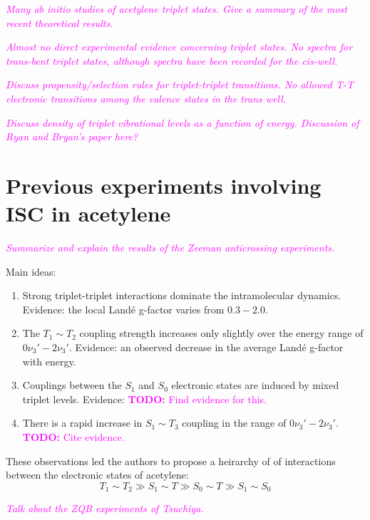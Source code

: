 \documentclass[12pt]{mitthesis}
\newcommand{\TODO} [1]{\textcolor{magenta}{\textbf{TODO:} #1}}
\newcommand{\POINT}[1]{\textcolor{magenta}{\emph{#1}}}
\begin{document}
\POINT{Many ab initio studies of acetylene triplet states.  Give a
  summary of the most recent theoretical results.}

\POINT{Almost no direct experimental evidence concerning triplet
  states.  No spectra for trans-bent triplet states, although spectra
  have been recorded for the cis-well.}

\POINT{Discuss propensity/selection rules for triplet-triplet
  transitions.  No allowed T-T electronic transitions among the
  valence states in the trans well.}

\POINT{Discuss density of triplet vibrational levels as a function of
  energy.  Discussion of Ryan and Bryan's paper here?}

\section{Previous experiments involving ISC in acetylene}

\POINT{Summarize and explain the results of the Zeeman anticrossing
  experiments.} 

Main ideas:
\begin{enumerate}

\item Strong triplet-triplet interactions dominate the intramolecular
  dynamics.  Evidence: the local Land\'{e} g-factor varies from
  $0.3-2.0$.

\item The $T_1 \sim T_2$ coupling strength increases only slightly over
  the energy range of $0\nu_3'-2\nu_3'$.  Evidence: an observed
  decrease in the average Land\'{e} g-factor with energy.

\item Couplings between the $S_1$ and $S_0$ electronic states are
  induced by mixed triplet levels.  Evidence: \TODO{Find evidence for
    this.}

\item There is a rapid increase in $S_1 \sim T_3$ coupling in the range of
  $0\nu_3'-2\nu_3'$. \TODO{Cite evidence.}

\end{enumerate}
These observations led the authors to propose a heirarchy of of
interactions between the electronic states of acetylene:
\begin{equation}
  T_1 \sim T_2 \gg S_1 \sim T \gg S_0 \sim T \gg S_1 \sim S_0
\end{equation}

\POINT{Talk about the ZQB experiments of Tsuchiya.}
\end{document}
